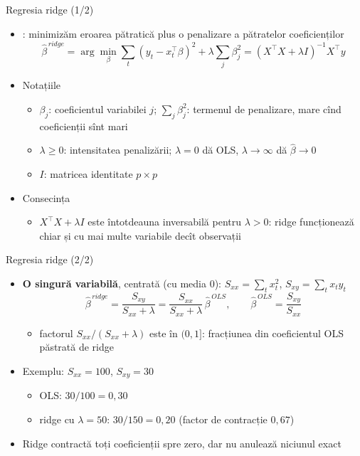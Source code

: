 \begin{frame}{Regresia ridge (1/2)}
\itemsize{\small}
\begin{itemize}
    \item {}: minimizăm eroarea pătratică plus o penalizare a pătratelor coeficienților \[ \hat\beta^{\,ridge} = \arg\min_\beta \sum_t (y_t - x_t^\top\beta)^2 + \lambda\sum_j \beta_j^2 = (X^\top X + \lambda I)^{-1}X^\top y \]
    \item Notațiile
    \begin{itemize}
        \item $\beta_j$: coeficientul variabilei $j$; $\sum_j \beta_j^2$: termenul de penalizare, mare cînd coeficienții sînt mari
        \item $\lambda \ge 0$: intensitatea penalizării; $\lambda = 0$ dă OLS, $\lambda \to \infty$ dă $\hat\beta \to 0$
        \item $I$: matricea identitate $p \times p$
    \end{itemize}
    \item Consecința
    \begin{itemize}
        \item $X^\top X + \lambda I$ este întotdeauna inversabilă pentru $\lambda > 0$: ridge funcționează chiar și cu mai multe variabile decît observații
    \end{itemize}
\end{itemize}
\end{frame}

\begin{frame}{Regresia ridge (2/2)}
\itemsize{\small}
\begin{itemize}
    \item \textbf{O singură variabilă}, centrată (cu media 0): $S_{xx} = \sum_t x_t^2$, $S_{xy} = \sum_t x_ty_t$ \[ \hat\beta^{\,ridge} = \dfrac{S_{xy}}{S_{xx} + \lambda} = \dfrac{S_{xx}}{S_{xx} + \lambda}\,\hat\beta^{\,OLS}, \qquad \hat\beta^{\,OLS} = \dfrac{S_{xy}}{S_{xx}} \]
    \begin{itemize}
        \item factorul $S_{xx}/(S_{xx} + \lambda)$ este în $(0, 1]$: fracțiunea din coeficientul OLS păstrată de ridge
    \end{itemize}
    \item Exemplu: $S_{xx} = 100$, $S_{xy} = 30$
    \begin{itemize}
        \item OLS: $30/100 = 0{,}30$
        \item ridge cu $\lambda = 50$: $30/150 = 0{,}20$ (factor de contracție $0{,}67$)
    \end{itemize}
    \item Ridge contractă toți coeficienții spre zero, dar nu anulează niciunul exact
\end{itemize}
\end{frame}

